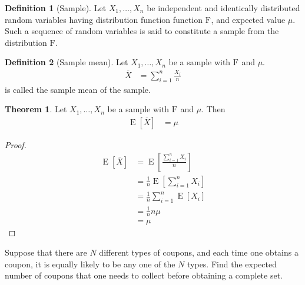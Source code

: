 \documentclass[titlepage, fleqn, a4paper, 12pt, twoside]{article}
\theoremstyle{definition}
\newtheorem{definition}{Definition}
\theoremstyle{theorem}
\newtheorem{theorem}{Theorem}
\DeclareMathOperator{\expct}{\mathrm{E}}
\newcommand*{\cdf}[1]{\mathrm{F}_{#1}}
\begin{document}
\begin{definition}[Sample]
	Let $X_1,\dots,X_n$ be independent and identically distributed random variables having distribution function function $\cdf{}$, and expected value $\mu$.
	Such a sequence of random variables is said to constitute a sample from the distribution $\cdf{}$.
\end{definition}

\begin{definition}[Sample mean]
	Let $X_1,\dots,X_n$ be a sample with $\cdf{}$ and $\mu$.
	\begin{align*}
		\overline{X} & = \sum\limits_{i = 1}^{n} \frac{X_i}{n}
	\end{align*}
	is called the sample mean of the sample.
\end{definition}

\begin{theorem}
	Let $X_1,\dots,X_n$ be a sample with $\cdf{}$ and $\mu$.
	Then
	\begin{align*}
		\expct\left[ \overline{X} \right] & = \mu
	\end{align*}
\end{theorem}

\begin{proof}
	\begin{align*}
		\expct\left[ \overline{X} \right] & = \expct\left[ \frac{\sum\limits_{i = 1}^{n} X_i}{n} \right]   \\
                                                  & = \frac{1}{n} \expct\left[ \sum\limits_{i = 1}^{n} X_i \right] \\
                                                  & = \frac{1}{n} \sum\limits_{i = 1}^{n} \expct[X_i]              \\
                                                  & = \frac{1}{n} n \mu                                            \\
                                                  & = \mu
	\end{align*}
\end{proof}

\begin{question}
	Suppose that there are $N$ different types of coupons, and each time one obtains a coupon, it is equally likely to be any one of the $N$ types.
	Find the expected number of coupons that one needs to collect before obtaining a complete set.
\end{question}
\end{document}
